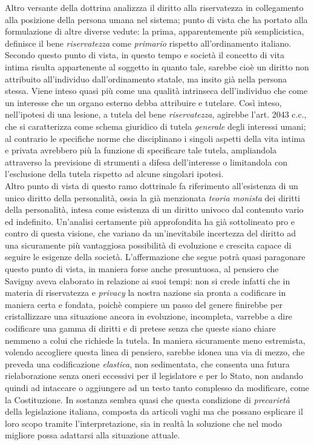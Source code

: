 Altro versante della dottrina analizzza il diritto alla riservatezza in collegamento alla posizione della persona umana nel sistema; punto di vista che ha portato alla formulazione di altre diverse vedute:
la prima, apparentemente più semplicistica, definisce il bene \textit{riservatezza} come \textit{primario} rispetto all'ordinamento italiano. Secondo questo punto di vista, in questo tempo e società il concetto di vita intima risulta appartenente al soggetto in quanto tale, sarebbe cioè un diritto non attribuito all'individuo dall'ordinamento statale, ma insito già nella persona stessa. Viene inteso quasi più come una qualità intrinseca dell'individuo che come un interesse che un organo esterno debba attribuire e tutelare.
Così inteso, nell'ipotesi di una lesione, a tutela del bene \textit{riservatezza}, agirebbe l'art. 2043 c.c., che si caratterizza come schema giuridico di tutela \textit{generale} degli interessi umani; al contrario le  specifiche norme che disciplinano i singoli aspetti della vita intima e privata avrebbero più la funzione di specificare tale tutela,  ampliandola attraverso la previsione di strumenti a difesa dell'interesse o limitandola con l'esclusione della tutela rispetto ad alcune singolari ipotesi.
\\Altro punto di vista di questo ramo dottrinale fa riferimento all'esistenza di un unico diritto della personalità, ossia la già menzionata \textit{teoria monista} dei diritti della personalità, intesa come esistenza di un diritto univoco dal contenuto vario ed indefinito.
Un'analisi certamente più approfondita ha già sottolineato pro e contro di questa visione, che variano da un'inevitabile incertezza del diritto ad una sicuramente più vantaggiosa possibilità di evoluzione e crescita capace di seguire le esigenze della società.
L'affermazione che segue potrà quasi paragonare questo punto di vista, in maniera forse anche presuntuosa, al pensiero che Savigny aveva elaborato in relazione ai suoi tempi: non si crede infatti che in materia di riservatezza e \textit{privacy} la nostra nazione sia pronta a codificare in maniera certa e fondata, poichè compiere un passo del genere finirebbe per cristallizzare una situazione ancora in evoluzione, incompleta, varrebbe a dire codificare una gamma di diritti e di pretese senza che queste siano chiare nemmeno a colui che richiede la tutela. In maniera sicuramente meno estremista, volendo accogliere questa linea di pensiero, sarebbe idonea una via di mezzo, che preveda una codificazione \textit{elastica}, non sedimentata, che consenta una futura rielaborazione senza oneri eccessivi per il legislatore e per lo Stato, non andando quindi ad intaccare o aggiungere ad un testo tanto complesso da modificare, come la Costituzione. In sostanza sembra quasi che questa condizione di \textit{precarietà} della legislazione italiana, composta da articoli vaghi ma che possano esplicare il loro scopo tramite l'interpretazione, sia in realtà la soluzione che nel modo migliore possa adattarsi alla situazione attuale. 
